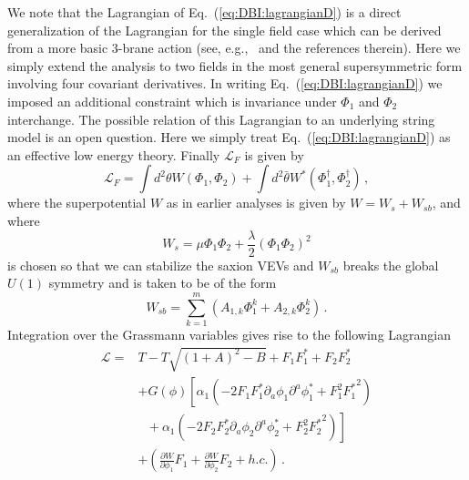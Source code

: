 \documentclass[12pt]{article}
\begin{document}
We note that the Lagrangian of Eq.~(\ref{eq:DBI:lagrangianD}) is a direct generalization of the Lagrangian for the single field case which can be derived from a more basic 3-brane action (see, e.g.,~\cite{Rocek:1997hi, Tseytlin:1999dj, Sasaki:2012ka} and the references therein).
Here we simply extend the analysis to two fields in the most general supersymmetric form involving four covariant derivatives.
In writing Eq.~(\ref{eq:DBI:lagrangianD}) we imposed an additional constraint which is invariance under $\Phi_1$ and $\Phi_2$ interchange.
The possible relation of this Lagrangian to an underlying string model is an open question.
Here we simply treat Eq.~(\ref{eq:DBI:lagrangianD}) as an effective low energy theory.
Finally $\mathcal{L}_F$ is given by
\begin{equation}
  \mathcal{L}_F = \int d^2 \theta W\left(\Phi_1, \Phi_2\right)
                + \int d^2 \bar\theta W^*\left(\Phi_1^\dagger, \Phi_2^\dagger\right)\,,
\end{equation}
where the superpotential $W$ as in earlier analyses is given by $W = W_s + W_{sb}$, and where
\begin{equation}
W_s = \mu \Phi_1 \Phi_2 + \frac{\lambda}{2} \left(\Phi_1 \Phi_2\right)^2
\end{equation}
is chosen so that we can stabilize the saxion VEVs and $W_{sb}$ breaks the global $U\left(1\right)$ symmetry and is taken to be of the form
\begin{equation} \label{eq:dbi:Wsb}
  W_{sb} = \sum_{k = 1}^m \left(A_{1, k} \Phi_1^k + A_{2, k} \Phi_2^k\right)\,.
\end{equation}
Integration over the Grassmann variables gives rise to the following Lagrangian
\begin{equation} \label{eq:dbi:lagrangianIntermediate}
  \begin{aligned}
    \mathcal{L} =
      & T - T \sqrt{\left(1 + A\right)^2 - B} + F_1 F^*_1 + F_2 F^*_2\\
      &+ G\left(\phi\right) \left[
        \alpha_1 \left(
          - 2 F_1 F^*_1 \partial_a \phi_1 \partial^a \phi^*_1
          + F_1^2 {F^*_1}^2
        \right)\right.\\
        &~~~ \left.{} + \alpha_1 \left(
          - 2 F_2 F^*_2 \partial_a \phi_2 \partial^a \phi^*_2
          + F_2^2 {F^*_2}^2
        \right)\right]\\
      &+ \left(
          \frac{\partial W}{\partial \phi_1} F_1
        + \frac{\partial W}{\partial \phi_2} F_2
        + h.c.
      \right)\,.
  \end{aligned}
\end{equation}
\end{document}

